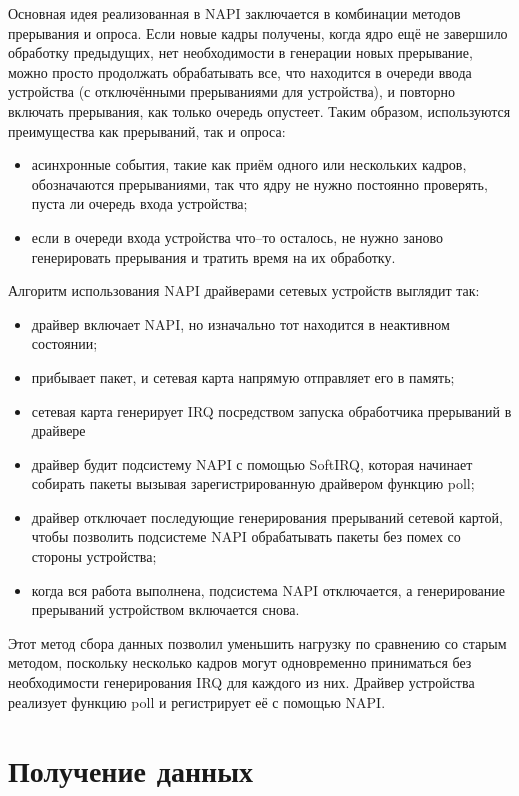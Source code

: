Основная идея реализованная в NAPI заключается в комбинации методов прерывания и опроса. Если новые кадры получены, когда ядро ещё не завершило обработку предыдущих, нет необходимости в генерации новых прерывание, можно просто продолжать обрабатывать все, что находится в очереди ввода устройства (с отключёнными прерываниями для устройства), и повторно включать прерывания, как только очередь опустеет. Таким образом,  используются преимущества как прерываний, так и опроса:
\begin{itemize}[label=---]
	\item асинхронные события, такие как приём одного или нескольких кадров, обозначаются прерываниями, так что ядру не нужно постоянно проверять, пуста ли очередь входа устройства;
	\item если в очереди входа устройства что--то осталось, не нужно заново генерировать прерывания и тратить время на их обработку.
\end{itemize}

Алгоритм использования NAPI драйверами сетевых устройств выглядит так:
\begin{itemize}[label=---]
	\item драйвер включает NAPI, но изначально тот находится в неактивном состоянии;
	\item прибывает пакет, и сетевая карта напрямую отправляет его в память;
	\item сетевая карта генерирует IRQ посредством запуска обработчика прерываний в драйвере
	\item драйвер будит подсистему NAPI с помощью SoftIRQ, которая начинает собирать пакеты вызывая зарегистрированную драйвером функцию poll;
	\item драйвер отключает последующие генерирования прерываний сетевой картой, чтобы позволить подсистеме NAPI обрабатывать пакеты без помех со стороны устройства;
	\item когда вся работа выполнена, подсистема NAPI отключается, а генерирование прерываний устройством включается снова.
\end{itemize}

Этот метод сбора данных позволил уменьшить нагрузку по сравнению со старым методом, поскольку несколько кадров могут одновременно приниматься без необходимости генерирования IRQ для каждого из них. Драйвер устройства реализует функцию poll и регистрирует её с помощью NAPI.

\section{Получение данных}

